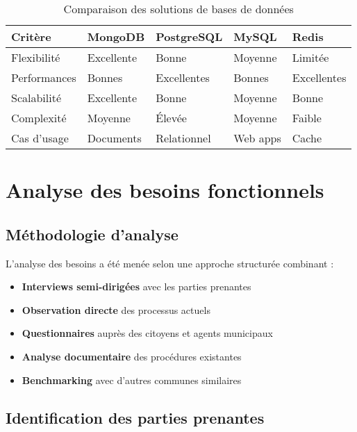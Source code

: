 \begin{table}[H]
\centering
\caption{Comparaison des solutions de bases de données}
\begin{tabular}{|l|p{3cm}|p{3cm}|p{3cm}|p{3cm}|}
\hline
\textbf{Critère} & \textbf{MongoDB} & \textbf{PostgreSQL} & \textbf{MySQL} & \textbf{Redis} \\
\hline
Flexibilité & Excellente & Bonne & Moyenne & Limitée \\
Performances & Bonnes & Excellentes & Bonnes & Excellentes \\
Scalabilité & Excellente & Bonne & Moyenne & Bonne \\
Complexité & Moyenne & Élevée & Moyenne & Faible \\
Cas d'usage & Documents & Relationnel & Web apps & Cache \\
\hline
\end{tabular}
\end{table}

\section{Analyse des besoins fonctionnels}

\subsection{Méthodologie d'analyse}

L'analyse des besoins a été menée selon une approche structurée combinant :

\begin{itemize}
\item \textbf{Interviews semi-dirigées} avec les parties prenantes
\item \textbf{Observation directe} des processus actuels
\item \textbf{Questionnaires} auprès des citoyens et agents municipaux
\item \textbf{Analyse documentaire} des procédures existantes
\item \textbf{Benchmarking} avec d'autres communes similaires
\end{itemize}

\subsection{Identification des parties prenantes}

